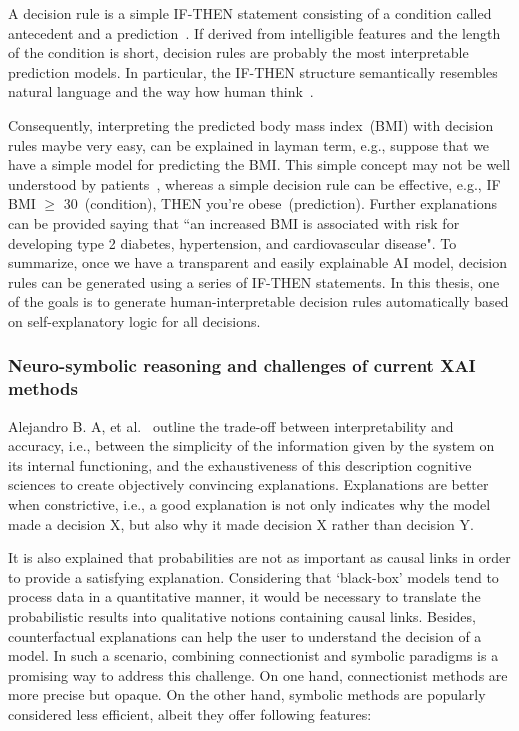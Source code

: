 \hspace*{3.5mm} A decision rule is a simple IF-THEN statement consisting of a condition called antecedent and a prediction~\cite{molnar2019interpretable}. If derived from intelligible features and the length of the condition is short, decision rules are probably the most interpretable prediction models. In particular, the IF-THEN structure semantically resembles natural language and the way how human think~\cite{molnar2019interpretable}. 

\hspace*{3.5mm} Consequently, interpreting the predicted body mass index~(BMI) with decision rules maybe very easy, can be explained in layman term, e.g., suppose that we have a simple model for predicting the BMI. This simple concept may not be well understood by patients~\cite{post2015patient}, whereas a simple decision rule can be effective, e.g., IF BMI $\geq$ 30~(condition), THEN you're obese~(prediction). Further explanations can be provided saying that ``an increased BMI is associated with risk for developing type 2 diabetes, hypertension, and cardiovascular disease". To summarize, once we have a transparent and easily explainable AI model, decision rules can be generated using a series of IF-THEN statements. In this thesis, one of the goals is to generate human-interpretable decision rules automatically based on self-explanatory logic for all decisions. 


\subsubsection{Neuro-symbolic reasoning and challenges of current XAI methods}
Alejandro B. A, et al.~\cite{arrieta2020explainable} outline the trade-off between interpretability and accuracy, i.e., between the simplicity of the information given by the system on its internal functioning, and the exhaustiveness of this description
cognitive sciences to create objectively convincing explanations.
Explanations are better when constrictive, i.e., a good explanation is not only indicates why the model made a decision $\mathrm{X}$, but also why it made decision $\mathrm{X}$ rather than decision $\mathrm{Y}$. 

\hspace*{3.5mm}It is also explained that probabilities are not as important as causal links in order to provide a satisfying explanation. Considering that `black-box' models tend to process data in a quantitative manner, it would be necessary to translate the probabilistic results into qualitative notions containing causal links. Besides, counterfactual explanations can help the user to understand the decision of a model. In such a scenario, combining connectionist and symbolic paradigms is a promising way to address this challenge. On one hand, connectionist methods are more precise but opaque. On the other hand, symbolic methods are popularly considered less efficient, albeit they offer following features:

